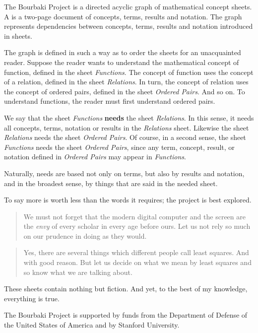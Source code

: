 
\sbasic

\sstart
{}

The Bourbaki Project is a directed acyclic graph of
mathematical concept sheets.
A  is a two-page document of
concepts, terms, results and notation.
The graph represents dependencies between concepts,
terms, results and notation introduced in sheets.

The graph is defined in such a way as to
order the sheets for an unacquainted reader.
Suppose the reader wants to understand the
mathematical concept of function, defined
in the sheet \textit{Functions}.
The concept of function uses the concept of a
relation,
defined in the sheet \textit{Relations}.
In turn, the concept of relation uses the
concept of ordered pairs, defined in
the sheet \textit{Ordered Pairs}.
And so on.
To understand functions, the reader must
first understand ordered pairs.

We say that the sheet \textit{Functions}
\textbf{needs} the sheet \textit{Relations}.
In this sense, it needs all concepts,
terms, notation or results in the
\textit{Relations} sheet.
Likewise the sheet \textit{Relations}
needs the sheet \textit{Ordered Pairs}.
Of course, in a second sense, the sheet
\textit{Functions} needs the sheet
\textit{Ordered Pairs},
since any term, concept,
result, or notation defined in
\textit{Ordered Pairs} may appear in
\textit{Functions}.

Naturally, needs are based not only
on terms, but also by results and notation,
and in the broadest sense, by things that are said in the
needed sheet.
\clearpage

To say more is worth less than the words it requires;
the project is best explored.

\begin{quote}
We must not forget that the
modern digital computer and
the screen are the \textit{envy} of
every scholar in every age
before ours. Let us not rely
so much
on our prudence in doing
as they would.
\end{quote}

\begin{quote}
Yes, there are several things
which different people call
least squares. And with good
reason. But let us decide on
what we mean by least squares
and so know what we are talking
about.
\end{quote}

These sheets contain nothing
but fiction. And yet, to the best
of my knowledge, everything
is true.

The Bourbaki Project is supported by
funds from the Department of
Defense of the United States of America
and by Stanford University.
\strats
